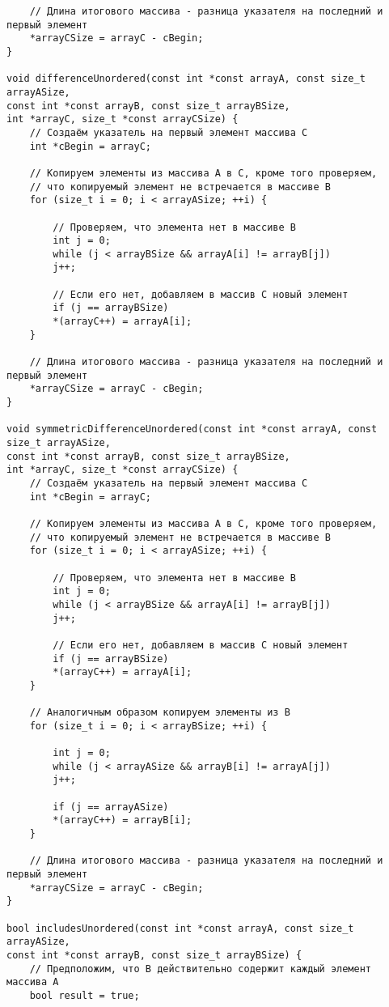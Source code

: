 \documentclass[a4paper,14pt]{extarticle}
\begin{document}
\begin{enumerate}[№1. ]
\begin{enumerate}[label=\asbuk*),ref=\asbuk*]
\begin{verbatim}
	// Длина итогового массива - разница указателя на последний и первый элемент
	*arrayCSize = arrayC - cBegin;
}

void differenceUnordered(const int *const arrayA, const size_t arrayASize,
const int *const arrayB, const size_t arrayBSize,
int *arrayC, size_t *const arrayCSize) {
	// Создаём указатель на первый элемент массива С
	int *cBegin = arrayC;
	
	// Копируем элементы из массива A в C, кроме того проверяем,
	// что копируемый элемент не встречается в массиве B
	for (size_t i = 0; i < arrayASize; ++i) {
		
		// Проверяем, что элемента нет в массиве B
		int j = 0;
		while (j < arrayBSize && arrayA[i] != arrayB[j])
		j++;
		
		// Если его нет, добавляем в массив C новый элемент
		if (j == arrayBSize)
		*(arrayC++) = arrayA[i];
	}
	
	// Длина итогового массива - разница указателя на последний и первый элемент
	*arrayCSize = arrayC - cBegin;
}

void symmetricDifferenceUnordered(const int *const arrayA, const size_t arrayASize,
const int *const arrayB, const size_t arrayBSize,
int *arrayC, size_t *const arrayCSize) {
	// Создаём указатель на первый элемент массива С
	int *cBegin = arrayC;
	
	// Копируем элементы из массива A в C, кроме того проверяем,
	// что копируемый элемент не встречается в массиве B
	for (size_t i = 0; i < arrayASize; ++i) {
		
		// Проверяем, что элемента нет в массиве B
		int j = 0;
		while (j < arrayBSize && arrayA[i] != arrayB[j])
		j++;
		
		// Если его нет, добавляем в массив C новый элемент
		if (j == arrayBSize)
		*(arrayC++) = arrayA[i];
	}
	
	// Аналогичным образом копируем элементы из B
	for (size_t i = 0; i < arrayBSize; ++i) {
		
		int j = 0;
		while (j < arrayASize && arrayB[i] != arrayA[j])
		j++;
		
		if (j == arrayASize)
		*(arrayC++) = arrayB[i];
	}
	
	// Длина итогового массива - разница указателя на последний и первый элемент
	*arrayCSize = arrayC - cBegin;
}

bool includesUnordered(const int *const arrayA, const size_t arrayASize,
const int *const arrayB, const size_t arrayBSize) {
	// Предположим, что B действительно содержит каждый элемент массива A
	bool result = true;
	

\end{verbatim}
\end{enumerate}
\end{enumerate}
\end{document}
